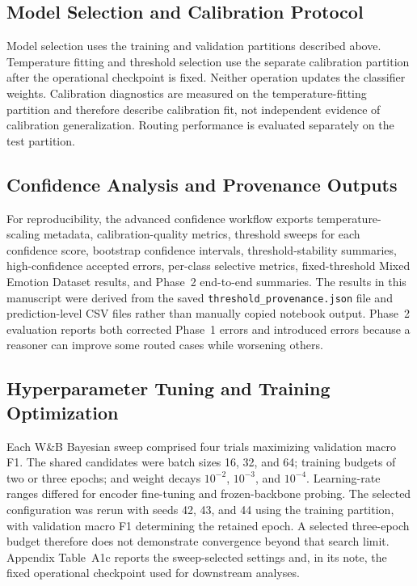 \documentclass{ieeeaccess}
\begin{document}
\subsection{Model Selection and Calibration Protocol}

Model selection uses the training and validation partitions described above. Temperature fitting and threshold selection use the separate calibration partition after the operational checkpoint is fixed. Neither operation updates the classifier weights. Calibration diagnostics are measured on the temperature-fitting partition and therefore describe calibration fit, not independent evidence of calibration generalization. Routing performance is evaluated separately on the test partition.

\subsection{Confidence Analysis and Provenance Outputs}

For reproducibility, the advanced confidence workflow exports temperature-scaling metadata, calibration-quality metrics, threshold sweeps for each confidence score, bootstrap confidence intervals, threshold-stability summaries, high-confidence accepted errors, per-class selective metrics, fixed-threshold Mixed Emotion Dataset results, and Phase~2 end-to-end summaries. The results in this manuscript were derived from the saved \texttt{threshold\_provenance.json} file and prediction-level CSV files rather than manually copied notebook output. Phase~2 evaluation reports both corrected Phase~1 errors and introduced errors because a reasoner can improve some routed cases while worsening others.

\subsection{Hyperparameter Tuning and Training Optimization}

Each W\&B Bayesian sweep comprised four trials maximizing validation macro F1. The shared candidates were batch sizes 16, 32, and 64; training budgets of two or three epochs; and weight decays $10^{-2}$, $10^{-3}$, and $10^{-4}$. Learning-rate ranges differed for encoder fine-tuning and frozen-backbone probing. The selected configuration was rerun with seeds 42, 43, and 44 using the training partition, with validation macro F1 determining the retained epoch. A selected three-epoch budget therefore does not demonstrate convergence beyond that search limit. Appendix Table~A1c reports the sweep-selected settings and, in its note, the fixed operational checkpoint used for downstream analyses.
\end{document}
